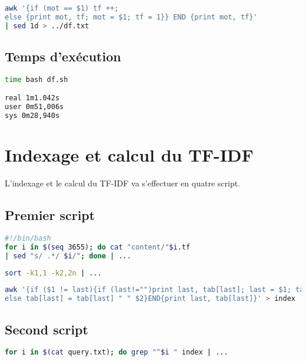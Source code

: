 \documentclass{article}
\begin{document}
\begin{lstlisting}[language=bash,caption={Occurences}]
awk '{if (mot == $1) tf ++; 
else {print mot, tf; mot = $1; tf = 1}} END {print mot, tf}' 
| sed 1d > ../df.txt
\end{lstlisting}

\subsection{Temps d'exécution}

\begin{lstlisting}[language=bash,caption={Temps d'exécution du script df.sh}]
time bash df.sh

real 1m1.042s
user 0m51,006s
sys 0m28,940s

\end{lstlisting}

\section{Indexage et calcul du TF-IDF}

L'indexage et le calcul du TF-IDF va s'effectuer en quatre script. 

\subsection{Premier script}

\begin{lstlisting}[language=bash,caption={Requête 1}]
#!/bin/bash
for i in $(seq 3655); do cat "content/"$i.tf 
| sed "s/ .*/ $i/"; done | ...
\end{lstlisting}

\begin{lstlisting}[language=bash,caption={Requête 2}]
sort -k1,1 -k2,2n | ...
\end{lstlisting}

\begin{lstlisting}[language=bash,caption={Requête 3}]
awk '{if ($1 != last){if (last!="")print last, tab[last]; last = $1; tab[last] = $2} 
else tab[last] = tab[last] " " $2}END{print last, tab[last]}' > index
\end{lstlisting}


\subsection{Second script}

\begin{lstlisting}[language=bash,caption={Requete 1}]
for i in $(cat query.txt); do grep "^$i " index | ...
\end{lstlisting}
\end{document}
